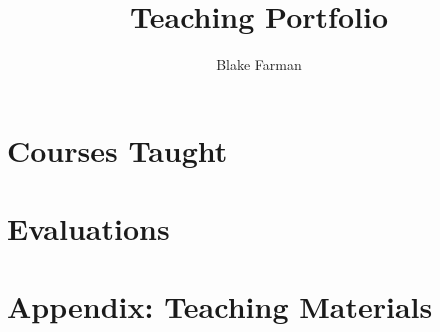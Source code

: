 \documentclass[10pt]{amsart}
\author{Blake Farman}
\title{Teaching Portfolio}
\date{}
\begin{document}
\maketitle

\tableofcontents

\section{Courses Taught}

\section{Evaluations}

\newpage
\section{Appendix: Teaching Materials}



\end{document}
